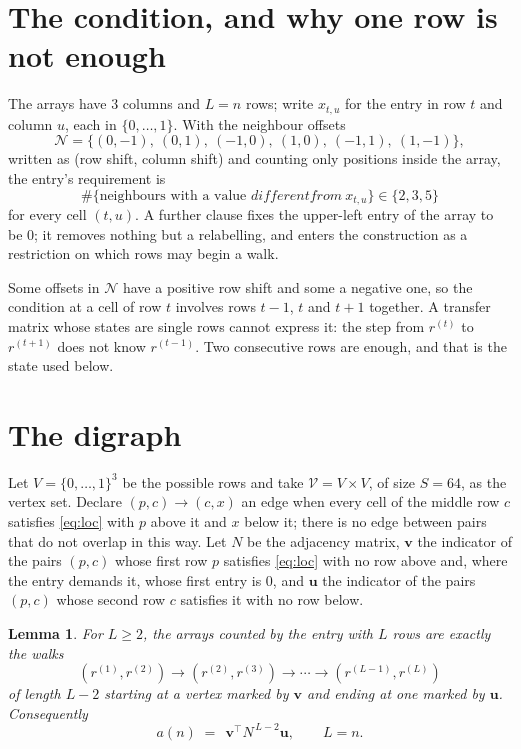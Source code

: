 \documentclass[11pt,a4paper]{article}
\theoremstyle{plain}
\newtheorem{lemma}[theorem]{Lemma}
\theoremstyle{definition}
\begin{document}
\section{The condition, and why one row is not enough}

The arrays have $3$ columns and $L=n$ rows; write $x_{t,u}$ for the entry in
row $t$ and column $u$, each in $\{0,\dots,1\}$. With the neighbour offsets
\[
\mathcal N=\{(0,-1),\ (0,1),\ (-1,0),\ (1,0),\ (-1,1),\ (1,-1)\},
\]
written as (row shift, column shift) and counting only positions inside the array, the
entry's requirement is
\begin{equation}\label{eq:loc}
\#\{\text{neighbours with a value }different from\ x_{t,u}\}\in\{2,3,5\}
\end{equation}
for every cell $(t,u)$. A further clause fixes the upper-left entry of the array to be $0$; it removes nothing but a relabelling, and enters the construction as a restriction on which rows may begin a walk.

Some offsets in $\mathcal N$ have a positive row shift and some a negative one, so the
condition at a cell of row $t$ involves rows $t-1$, $t$ and $t+1$ together. A transfer
matrix whose states are single rows cannot express it: the step from $r^{(t)}$ to
$r^{(t+1)}$ does not know $r^{(t-1)}$. Two consecutive rows are enough, and that is
the state used below.

\section{The digraph}

Let $V=\{0,\dots,1\}^{3}$ be the possible rows and take
$\mathcal V=V\times V$, of size $S=64$, as the vertex set. Declare $(p,c)\to(c,x)$ an edge
when every cell of the middle row $c$ satisfies \eqref{eq:loc} with $p$ above it and $x$
below it; there is no edge between pairs that do not overlap in this way. Let $N$ be the
adjacency matrix, $\mathbf{v}$ the indicator of the pairs $(p,c)$ whose first row $p$
satisfies \eqref{eq:loc} with no row above and, where the entry demands it, whose first entry is $0$, and $\mathbf{u}$ the indicator of
the pairs $(p,c)$ whose second row $c$ satisfies it with no row below.

\begin{lemma}\label{lem:walk}
For $L\ge2$, the arrays counted by the entry with $L$ rows are exactly the walks
\[
(r^{(1)},r^{(2)})\to(r^{(2)},r^{(3)})\to\cdots\to(r^{(L-1)},r^{(L)})
\]
of length $L-2$ starting at a vertex marked by $\mathbf{v}$ and ending at one marked by
$\mathbf{u}$. Consequently
\[
a(n)\;=\;\,\mathbf{v}^{\!\top}N^{\,L-2}\mathbf{u},\qquad L=n .
\]
\end{lemma}
\end{document}

